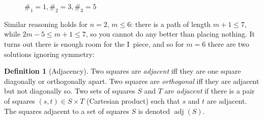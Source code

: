 \documentclass{article}
\theoremstyle{definition}%
\newtheorem{definition}[theorem]{Definition}
\newcommand{\newterm}[1]{\textit{#1}}
\newcommand{\adj}{\operatorname{adj}}
\begin{document}
\begin{figure}[htbp]
    \centering
    \caption{$\#_1 = 1, \#_2 = 3, \#_3 = 5$ \cite{v1}}
    \label{fig:no123}
\end{figure}

Similar reasoning holds for $n = 2$, $m \le 6$: there is a path of length $m + 1 \le 7$, while $2m - 5 \le m + 1 \le 7$, so you cannot do any better than placing nothing. It turns out there is enough room for the I~piece, and so for $m = 6$ there are two solutions ignoring symmetry:

\begin{figure}[htbp]
    \centering
    \label{fig:no2x5}
\end{figure}

\begin{definition}[Adjacency]
Two squares are \newterm{adjacent} iff they are one square diagonally or orthogonally apart. Two squares are \newterm{orthogonal} iff they are adjacent but not diagonally so. Two sets of squares $S$ and $T$ are \newterm{adjacent} if there is a pair of squares $(s, t) \in S \times T$ (Cartesian product) such that $s$ and $t$ are adjacent. The squares adjacent to a set of squares $S$ is denoted $\adj(S)$.
\end{definition}
\end{document}

